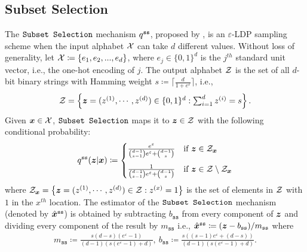 \subsection{Subset Selection}
The $\texttt{Subset Selection}$ mechanism $q^{\texttt{ss}}$, proposed by \cite{YB18}, is an $\varepsilon$-LDP sampling scheme when the input alphabet $\mathcal{X}$ can take $d$ different values.
Without loss of generality, let 
$\mathcal{X} \coloneqq \left\{ e_1, e_2,...,e_d \right\}$, where $e_j \in \{0, 1\}^d$ is the $j^{th}$ standard unit vector, i.e., the one-hot encoding of $j$.
The output alphabet $\mathcal{Z}$ is the set of all $d$-bit binary strings with Hamming weight $s \coloneqq \lceil \frac{d}{1+e^{\varepsilon}}\rceil$, i.e.,
\begin{align*}
\textstyle
\mathcal{Z} = \left\{ {\boldsymbol{z}} = (z^{(1)}, \cdots ,z^{(d)}) \in \{0, 1\}^d: \sum_{i=1}^d z^{(i)} = s \right\}.
\end{align*}
Given ${\boldsymbol{x}} \in \mathcal{X}$,  $\texttt{Subset Selection}$ maps it to ${\boldsymbol{z}} \in \mathcal{Z}$ with the following conditional probability:
\begin{align}\label{eq:q_ss}
    q^{\texttt{ss}}({\boldsymbol{z}}|{\boldsymbol{x}}) \coloneqq \begin{cases}
    \frac{e^{\varepsilon}}{{ \binom{d-1}{s-1} }e^{\varepsilon}+{ \binom{d-1}{s} }} & \text{if}\ {\boldsymbol{z}} \in \mathcal{Z}_{{\boldsymbol{x}}}
    \\[10pt]
    \frac{1}{{ \binom{d-1}{s-1} }e^{\varepsilon}+{ \binom{d-1}{s} }} & \text{if}\ {\boldsymbol{z}} \in \mathcal{Z} \setminus \mathcal{Z}_{{\boldsymbol{x}}}
    \end{cases}
\end{align}
where $\mathcal{Z}_{{\boldsymbol{x}}} = \left\{ {\boldsymbol{z}} = (z^{(1)}, \cdots ,z^{(d)}) \in \mathcal{Z} : z^{(x)} = 1 \right\}$ is the set of elements in $\mathcal{Z}$ with $1$ in the $x^{th}$ location. The estimator of the $\texttt{Subset Selection}$ mechanism (denoted by $\hat{{\boldsymbol{x}}}^{\texttt{ss}}$) is obtained by subtracting $b_{\texttt{ss}}$ from every component of ${\boldsymbol{z}}$ and dividing every component of the result by $m_{\texttt{ss}}$ i.e., $\hat{{\boldsymbol{x}}}^{\texttt{ss}} \coloneqq ({\boldsymbol{z}} - b_{\texttt{ss}})/m_{\texttt{ss}}$ where 
\begin{align}\label{eq:m_ss}
    m_{\texttt{ss}} \coloneqq \frac{s(d  -  s)(e^{\varepsilon}-1)}{(d  -  1)(s(e^{\varepsilon}  -  1)+d)},\  b_{\texttt{ss}} \coloneqq  \frac{s((s  -  1)e^{\varepsilon} +(d  -  s))}{(d  -  1)(s(e^{\varepsilon}  -  1)+d)}.
\end{align}

